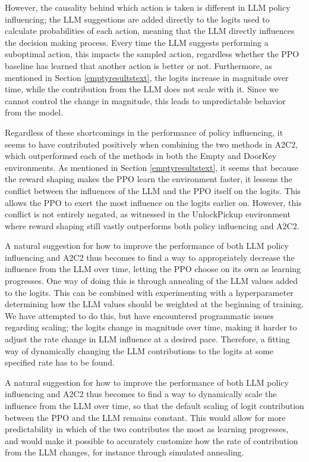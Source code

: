 \documentclass[conference]{IEEEtran}
\begin{document}
However, the causality behind which action is taken is different in LLM policy influencing; the LLM suggestions are added directly to the logits used to calculate probabilities of each action, meaning that the LLM directly influences the decision making process. Every time the LLM suggests performing a suboptimal action, this impacts the sampled action, regardless whether the PPO baseline has learned that another action is better or not. Furthermore, as mentioned in Section \ref{emptyresultstext}, the logits increase in magnitude over time, while the contribution from the LLM does not scale with it. Since we cannot control the change in magnitude, this leads to unpredictable behavior from the model.

Regardless of these shortcomings in the performance of policy influencing, it seems to have contributed positively when combining the two methods in A2C2, which outperformed each of the methods in both the Empty and DoorKey environments. As mentioned in Section \ref{emptyresultstext}, it seems that because the reward shaping makes the PPO learn the environment faster, it lessens the conflict between the influences of the LLM and the PPO itself on the logits. This allows the PPO to exert the most influence on the logits earlier on. However, this conflict is not entirely negated, as witnessed in the UnlockPickup environment where reward shaping still vastly outperforms both policy influencing and A2C2.

A natural suggestion for how to improve the performance of both LLM policy influencing and A2C2 thus becomes to find a way to appropriately decrease the influence from the LLM over time, letting the PPO choose on its own as learning progresses. One way of doing this is through annealing of the LLM values added to the logits. This can be combined with experimenting with a hyperparameter determining how the LLM values should be weighted at the beginning of training. We have attempted to do this, but have encountered programmatic issues regarding scaling; the logits change in magnitude over time, making it harder to adjust the rate change in LLM influence at a desired pace. Therefore, a fitting way of dynamically changing the LLM contributions to the logits at some specified rate has to be found.

A natural suggestion for how to improve the performance of both LLM policy influencing and A2C2 thus becomes to find a way to dynamically scale the influence from the LLM over time, so that the default scaling of logit contribution between the PPO and the LLM remains constant. This would allow for more predictability in which of the two contributes the most as learning progresses, and would make it possible to accurately customize how the rate of contribution from the LLM changes, for instance through simulated annealing.
\end{document}
